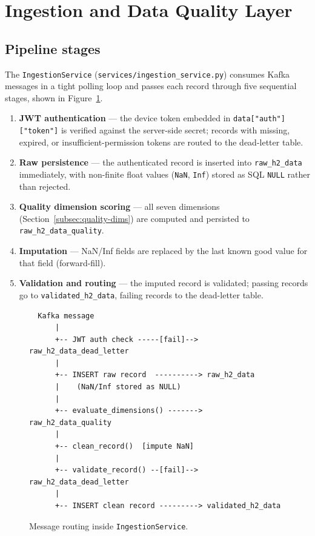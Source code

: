 \section{Ingestion and Data Quality Layer}
\label{sec:quality}

\subsection{Pipeline stages}
\label{subsec:ingestion-pipeline}

The \texttt{IngestionService} (\texttt{services/ingestion\_service.py})
consumes Kafka messages in a tight polling loop and passes each record
through five sequential stages, shown in Figure~\ref{fig:ingestion-flow}.

\begin{enumerate}
  \item \textbf{JWT authentication} — the device token embedded in
        \texttt{data["auth"]["token"]} is verified against the server-side
        secret; records with missing, expired, or insufficient-permission
        tokens are routed to the dead-letter table.
  \item \textbf{Raw persistence} — the authenticated record is inserted into
        \texttt{raw\_h2\_data} immediately, with non-finite float values
        (\texttt{NaN}, \texttt{Inf}) stored as SQL \texttt{NULL} rather than
        rejected.
  \item \textbf{Quality dimension scoring} — all seven dimensions
        (Section~\ref{subsec:quality-dims}) are computed and persisted to
        \texttt{raw\_h2\_data\_quality}.
  \item \textbf{Imputation} — NaN/Inf fields are replaced by the last
        known good value for that field (forward-fill).
  \item \textbf{Validation and routing} — the imputed record is validated;
        passing records go to \texttt{validated\_h2\_data}, failing records
        to the dead-letter table.
\end{enumerate}

\begin{figure}[H]
  \centering
  \begin{verbatim}
  Kafka message
      |
      +-- JWT auth check -----[fail]--> raw_h2_data_dead_letter
      |
      +-- INSERT raw record  ----------> raw_h2_data
      |    (NaN/Inf stored as NULL)
      |
      +-- evaluate_dimensions() -------> raw_h2_data_quality
      |
      +-- clean_record()  [impute NaN]
      |
      +-- validate_record() --[fail]--> raw_h2_data_dead_letter
      |
      +-- INSERT clean record ---------> validated_h2_data
  \end{verbatim}
  \caption{Message routing inside \texttt{IngestionService}.}
  \label{fig:ingestion-flow}
\end{figure}

